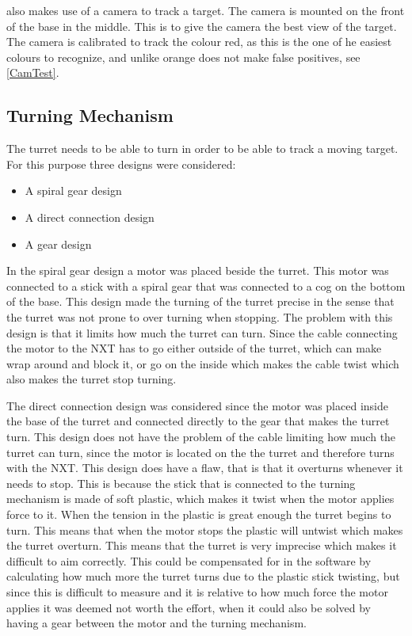 \name also makes use of a camera to track a target. The camera is mounted on
the front of the base in the middle. This is to give the camera the best
view of the target. The camera is calibrated to track the colour red, as this is
the one of he easiest colours to recognize, and unlike orange does not make
false positives, see \autoref{CamTest}.

\subsection{Turning Mechanism}
The turret needs to be able to turn in order to be able to track a moving
target. For this purpose three designs were considered:

\begin{itemize}
  \item A spiral gear design
  \item A direct connection design
  \item A gear design
\end{itemize}

In the spiral gear design a motor was placed beside the turret. This motor was
connected to a stick with a spiral gear that was connected to a cog on the bottom
of the base. This design made the turning of the turret precise in the sense
that the turret was not prone to over turning when stopping. The
problem with this design is that it limits how much the turret can turn.
Since the cable connecting the motor to the NXT has to go either
outside of the turret, which can make wrap around and block it, or go on the
inside which makes the cable twist which also makes the turret stop turning.\nl

The direct connection design was considered since the motor was placed inside
the base of the turret and connected directly to the gear that makes the turret turn. This
design does not have the problem of the cable limiting how much the turret can
turn, since the motor is located on the the turret and therefore turns with the
NXT. This design does have a flaw, that is that it overturns whenever it needs
to stop. This is because the stick that is connected to the turning mechanism
is made of soft plastic, which makes it twist when the motor applies force to
it. When the tension in the plastic is great enough the turret begins to turn.
This means that when the motor stops the plastic will untwist which makes the
turret overturn. This means that the turret is very imprecise which makes it
difficult to aim correctly. This could be compensated for in the software by
calculating how much more the turret turns due to the plastic stick twisting,
but since this is difficult to measure and it is relative to how much force the motor applies it was deemed
not worth the effort, when it could also be solved by having a gear between
the motor and the turning mechanism.\nl

